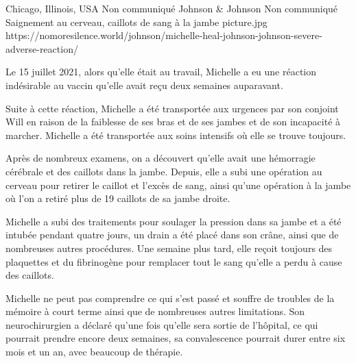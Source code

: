 {Chicago, Illinois, USA}
{Non communiqué}
{Johnson \& Johnson }
{Non communiqué}
{Saignement au cerveau, caillots de sang à la jambe}
{picture.jpg}
{https://nomoresilence.world/johnson/michelle-heal-johnson-johnson-severe-adverse-reaction/}
{

Le 15 juillet 2021, alors qu'elle était au travail, Michelle a eu une réaction
indésirable au vaccin qu'elle avait reçu deux semaines auparavant.

Suite à cette réaction, Michelle a été transportée aux urgences par son conjoint
Will en raison de la faiblesse de ses bras et de ses jambes et de son incapacité
à marcher. Michelle a été transportée aux soins intensifs où elle se trouve
toujours.

Après de nombreux examens, on a découvert qu'elle avait une hémorragie cérébrale
et des caillots dans la jambe. Depuis, elle a subi une opération au cerveau pour
retirer le caillot et l'excès de sang, ainsi qu'une opération à la jambe où l'on
a retiré plus de 19 caillots de sa jambe droite.

Michelle a subi des traitements pour soulager la pression dans sa jambe et a été
intubée pendant quatre jours, un drain a été placé dans son crâne, ainsi que de
nombreuses autres procédures. Une semaine plus tard, elle reçoit toujours des
plaquettes et du fibrinogène pour remplacer tout le sang qu'elle a perdu à cause
des caillots.

Michelle ne peut pas comprendre ce qui s'est passé et souffre de troubles de la
mémoire à court terme ainsi que de nombreuses autres limitations. Son
neurochirurgien a déclaré qu'une fois qu'elle sera sortie de l'hôpital, ce qui
pourrait prendre encore deux semaines, sa convalescence pourrait durer entre six
mois et un an, avec beaucoup de thérapie.

}

